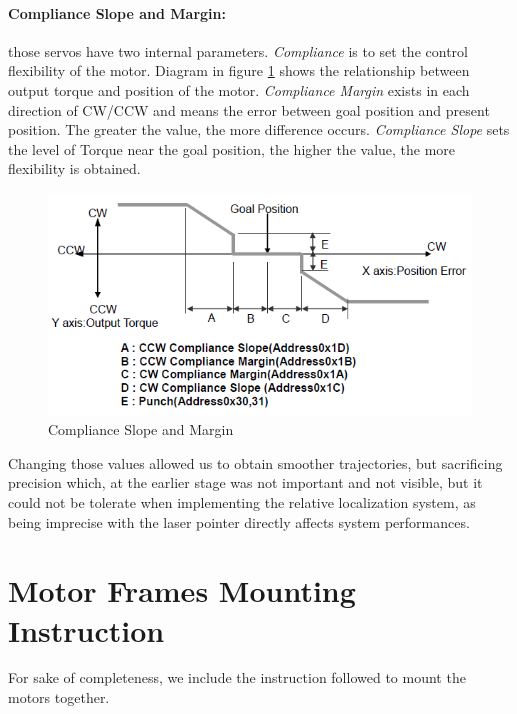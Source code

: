 \paragraph{Compliance Slope and Margin:} those servos have two internal parameters. \emph{Compliance} is to set the control flexibility of the motor.
Diagram in figure \ref{fig:compliance} shows the relationship between output torque and position of the motor. \emph{Compliance Margin} exists in each direction of CW/CCW and means the error between goal position and present position. The greater the value, the more difference occurs. \emph{Compliance Slope} sets the level of Torque near the goal position, the higher the value, the more flexibility is obtained.
\begin{figure}
	\centering
	\includegraphics[width=\textwidth]{img/compliance.png}%
	\caption{Compliance Slope and Margin}
	\label{fig:compliance}
\end{figure}
Changing those values allowed us to obtain smoother trajectories, but sacrificing precision which, at the earlier stage was not important and not visible, but it could not be tolerate when implementing the relative localization system, as being imprecise with the laser pointer directly affects system performances.


\section{Motor Frames Mounting Instruction}
For sake of completeness, we include the instruction followed to mount the motors together.

